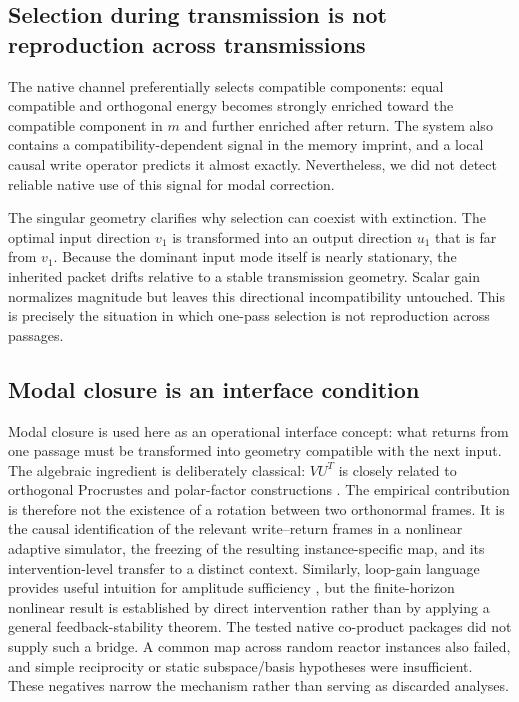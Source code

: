 \documentclass[aps,pre,preprint,superscriptaddress,nofootinbib]{revtex4-2}
\begin{document}
\subsection{Selection during transmission is not reproduction across transmissions}

The native channel preferentially selects compatible components: equal compatible and orthogonal energy becomes strongly enriched toward the compatible component in $m$ and further enriched after return. The system also contains a compatibility-dependent signal in the memory imprint, and a local causal write operator predicts it almost exactly. Nevertheless, we did not detect reliable native use of this signal for modal correction.

The singular geometry clarifies why selection can coexist with extinction. The optimal input direction $v_1$ is transformed into an output direction $u_1$ that is far from $v_1$. Because the dominant input mode itself is nearly stationary, the inherited packet drifts relative to a stable transmission geometry. Scalar gain normalizes magnitude but leaves this directional incompatibility untouched. This is precisely the situation in which one-pass selection is not reproduction across passages.

\subsection{Modal closure is an interface condition}

Modal closure is used here as an operational interface concept: what returns from one passage must be transformed into geometry compatible with the next input. The algebraic ingredient is deliberately classical: $VU^T$ is closely related to orthogonal Procrustes and polar-factor constructions \cite{Schonemann1966,Higham1986}. The empirical contribution is therefore not the existence of a rotation between two orthonormal frames. It is the causal identification of the relevant write--return frames in a nonlinear adaptive simulator, the freezing of the resulting instance-specific map, and its intervention-level transfer to a distinct context. Similarly, loop-gain language provides useful intuition for amplitude sufficiency \cite{Zames1966}, but the finite-horizon nonlinear result is established by direct intervention rather than by applying a general feedback-stability theorem. The tested native co-product packages did not supply such a bridge. A common map across random reactor instances also failed, and simple reciprocity or static subspace/basis hypotheses were insufficient. These negatives narrow the mechanism rather than serving as discarded analyses.
\end{document}
